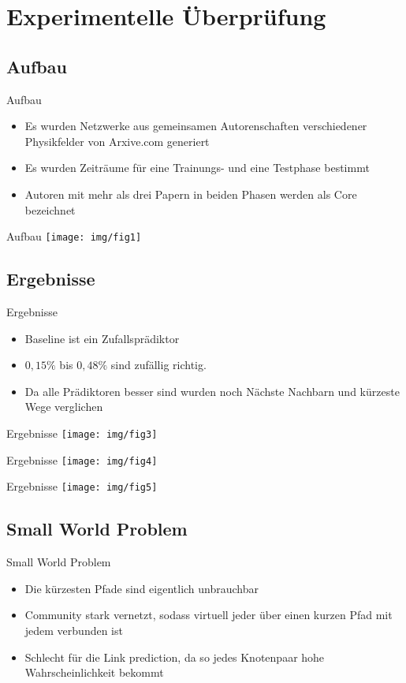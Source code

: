 \documentclass[12pt,titlepage]{beamer}
\begin{document}
	\section{Experimentelle Überprüfung}
	\subsection{Aufbau}
	\begin{frame}{Aufbau}
	\begin{itemize}
	\item Es wurden Netzwerke aus gemeinsamen Autorenschaften verschiedener Physikfelder von Arxive.com generiert
	\item Es wurden Zeiträume für eine Trainungs- und eine Testphase bestimmt
	\item Autoren mit mehr als drei Papern in beiden Phasen werden als Core bezeichnet 
	\end{itemize}
	\end{frame}
	\begin{frame}{Aufbau}
	\flushleft
	\texttt{[image: img/fig1]}
	\end{frame}
	\subsection{Ergebnisse}
	\begin{frame}{Ergebnisse}
	\begin{itemize}
	\item Baseline ist ein Zufallsprädiktor
	\item $0,15\%$ bis $0,48\%$ sind zufällig richtig.
	\item Da alle Prädiktoren besser sind wurden noch Nächste Nachbarn und kürzeste Wege verglichen
	\end{itemize}
	\end{frame}
	\begin{frame}{Ergebnisse}
	\texttt{[image: img/fig3]}
	\end{frame}
	\begin{frame}{Ergebnisse}
	\texttt{[image: img/fig4]}
	\end{frame}
	\begin{frame}{Ergebnisse}
	\texttt{[image: img/fig5]}
	\end{frame}
	\subsection{Small World Problem}
	\begin{frame}{Small World Problem}
	\begin{itemize}
	\item Die kürzesten Pfade sind eigentlich unbrauchbar
	\item Community stark vernetzt, sodass virtuell jeder über einen kurzen Pfad mit jedem verbunden ist
	\item Schlecht für die Link prediction, da so jedes Knotenpaar hohe Wahrscheinlichkeit bekommt
	\end{itemize}
	
	\end{frame}
\end{document}
